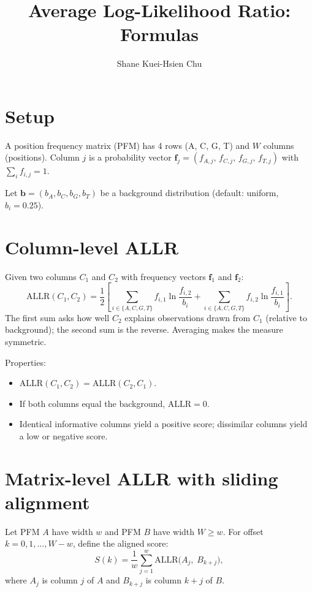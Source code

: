 \documentclass[11pt]{article}
\title{Average Log-Likelihood Ratio: Formulas}
\author{Shane Kuei-Hsien Chu}
\date{}
\begin{document}
\maketitle

\section{Setup}

A position frequency matrix (PFM) has 4 rows (A, C, G, T) and $W$ columns
(positions).  Column $j$ is a probability vector
$\mathbf{f}_j = (f_{A,j},\, f_{C,j},\, f_{G,j},\, f_{T,j})$
with $\sum_i f_{i,j} = 1$.

Let $\mathbf{b} = (b_A, b_C, b_G, b_T)$ be a background distribution
(default: uniform, $b_i = 0.25$).

\section{Column-level ALLR}

Given two columns $C_1$ and $C_2$ with frequency vectors
$\mathbf{f}_1$ and $\mathbf{f}_2$:
\begin{equation}
  \mathrm{ALLR}(C_1, C_2)
  = \frac{1}{2}\!\left[
      \sum_{i \in \{A,C,G,T\}} f_{i,1} \ln\!\frac{f_{i,2}}{b_i}
    + \sum_{i \in \{A,C,G,T\}} f_{i,2} \ln\!\frac{f_{i,1}}{b_i}
  \right].
\end{equation}
The first sum asks how well $C_2$ explains observations drawn from $C_1$
(relative to background); the second sum is the reverse.
Averaging makes the measure symmetric.

\medskip\noindent
Properties:
\begin{itemize}[nosep]
  \item $\mathrm{ALLR}(C_1, C_2) = \mathrm{ALLR}(C_2, C_1)$.
  \item If both columns equal the background, $\mathrm{ALLR} = 0$.
  \item Identical informative columns yield a positive score;
        dissimilar columns yield a low or negative score.
\end{itemize}

\section{Matrix-level ALLR with sliding alignment}

Let PFM $A$ have width $w$ and PFM $B$ have width $W \ge w$.
For offset $k = 0, 1, \dots, W - w$, define the aligned score:
\begin{equation}
  S(k) = \frac{1}{w} \sum_{j=1}^{w}
         \mathrm{ALLR}\!\bigl(A_j,\; B_{k+j}\bigr),
\end{equation}
where $A_j$ is column $j$ of $A$ and $B_{k+j}$ is column $k+j$ of $B$.
\end{document}
